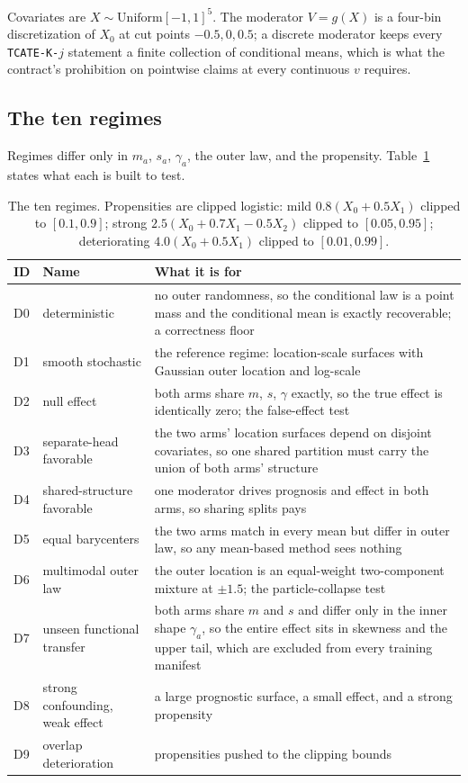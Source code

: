 \documentclass[11pt,a4paper]{article}
\theoremstyle{definition}
\theoremstyle{remark}
\begin{document}
Covariates are $X \sim \mathrm{Uniform}[-1,1]^5$. The moderator $V = g(X)$ is a
four-bin discretization of $X_0$ at cut points $-0.5, 0, 0.5$; a discrete
moderator keeps every \texttt{TCATE-K-}$j$ statement a finite collection of
conditional means, which is what the contract's prohibition on pointwise claims
at every continuous $v$ requires.

\subsection{The ten regimes}

Regimes differ only in $m_a$, $s_a$, $\gamma_a$, the outer law, and the
propensity. Table~\ref{tab:dgps} states what each is built to test.

\begin{table}[htbp]
\centering
\caption{The ten regimes. Propensities are clipped logistic: mild
$0.8(X_0 + 0.5X_1)$ clipped to $[0.1,0.9]$; strong
$2.5(X_0 + 0.7X_1 - 0.5X_2)$ clipped to $[0.05,0.95]$; deteriorating
$4.0(X_0 + 0.5X_1)$ clipped to $[0.01,0.99]$.}
\label{tab:dgps}
\small
\begin{tabular}{@{}llp{9.2cm}@{}}
\toprule
ID & Name & What it is for \\
\midrule
D0 & deterministic & no outer randomness, so the conditional law is a point mass and the conditional mean is exactly recoverable; a correctness floor \\
D1 & smooth stochastic & the reference regime: location-scale surfaces with Gaussian outer location and log-scale \\
D2 & null effect & both arms share $m$, $s$, $\gamma$ exactly, so the true effect is identically zero; the false-effect test \\
D3 & separate-head favorable & the two arms' location surfaces depend on disjoint covariates, so one shared partition must carry the union of both arms' structure \\
D4 & shared-structure favorable & one moderator drives prognosis and effect in both arms, so sharing splits pays \\
D5 & equal barycenters & the two arms match in every mean but differ in outer law, so any mean-based method sees nothing \\
D6 & multimodal outer law & the outer location is an equal-weight two-component mixture at $\pm1.5$; the particle-collapse test \\
D7 & unseen functional transfer & both arms share $m$ and $s$ and differ only in the inner shape $\gamma_a$, so the entire effect sits in skewness and the upper tail, which are excluded from every training manifest \\
D8 & strong confounding, weak effect & a large prognostic surface, a small effect, and a strong propensity \\
D9 & overlap deterioration & propensities pushed to the clipping bounds \\
\bottomrule
\end{tabular}
\end{table}
\end{document}
